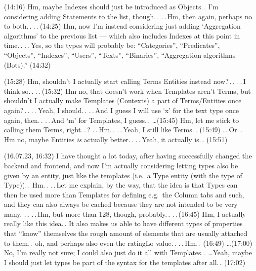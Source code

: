 \documentclass{report}
\begin{document}
(14:16) Hm, maybe Indexes should just be introduced as Objects.\,. I'm considering adding Statements to the list, though.\,. .\,.\,Hm, then again, perhaps no to both.\,. .\,.\,(14:25) Hm, now I'm instead considering just adding `Aggregation algorithms' to the previous list --- which also includes Indexes at this point in time.\,. .\,.\,Yes, so the types will probably be: ``Categories'',  ``Predicates'', ``Objects'',  ``Indexes'',  ``Users'',  ``Texts'',  ``Binaries'',  ``Aggregation algorithms (Bots).'' (14:32)


(15:28) Hm, shouldn't I actually start calling Terms Entities instead now?\,.\,. .\,.\,I think so.\,. .\,.\,(15:32) Hm no, that doesn't work when Templates aren't Terms, but shouldn't I actually make Templates (Contexts) a part of Terms/Entities once again?\,.\,. .\,.\,Yeah, I should.\,. .\,.\,And I guess I will use `x' for the text type once again, then.\,. .\,.\,And `m' for Templates, I guess.\,. \ldots (15:45) Hm, let me stick to calling them Terms, right.\,.\,? .\,.\,Hm.\,. .\,.\,Yeah, I still like Terms.\,. (15:49) .\,.\,Or.\,. Hm no, maybe Entities \emph{is} actually better.\,. .\,.\,Yeah, it actually is.\,. (15:51)

(16.07.23, 16:32) I have thought a lot today, after having successfully changed the backend and frontend, and now I'm actually considering letting types also be given by an entity, just like the templates (i.e.\ a Type entity (with the type of Type)).\,. Hm.\,. .\,.\,Let me explain, by the way, that the idea is that Types can then be used more than Templates for defining e.g.\ the Column tabs and such, and they can also always be cached because they are not intended to be very many. .\,. .\,.\,Hm, but more than 128, though, probably.\,. .\,.\,(16:45) Hm, I actually really like this idea.\,. It also makes us able to have different types of properties that ``know'' themselves the rough amount of elements that are usually attached to them.\,. oh, and perhaps also even the ratingLo value.\,. .\,.\,Hm.\,. (16:49) \ldots (17:00) No, I'm really not sure; I  could also just do it all with Templates.\,. \ldots Yeah, maybe I should just let types be part of the syntax for the templates after all.\,. (17:02)
\end{document}
